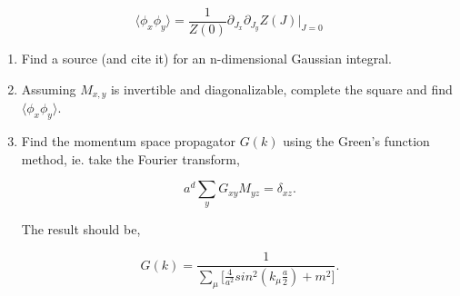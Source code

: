 \documentclass{article}
\begin{document}
\begin{enumerate}
\begin{equation}
\langle \phi_x \phi_y \rangle = \frac{1}{Z(0)} \partial_{J_x} \partial_{J_y} Z(J) \Bigr|_{J=0}
\end{equation}

\begin{enumerate}
\item Find a source (and cite it) for an n-dimensional Gaussian integral.

\item Assuming $M_{x,y}$ is invertible and diagonalizable, complete the square and find $\langle \phi_{x} \phi_{y} \rangle$.

\item Find the momentum space propagator $G(k)$ using the Green's function method, ie. take the Fourier transform,

\begin{equation}
a^d \sum_y G_{xy} M_{yz} = \delta_{xz}.
\end{equation}

The result should be,

\begin{equation}
G(k) =\frac{1}{\sum_\mu \bigg[ \frac{4}{a^2}sin^2(k_\mu \frac{a}{2})  + m^2\bigg]}.
\end{equation}

\end{enumerate}

\end{enumerate}
\end{document}
